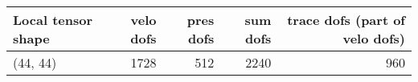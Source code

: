 \begin{tabular}{lrrrr}
\toprule
Local tensor shape &  velo dofs &  pres dofs &  sum dofs &  trace dofs (part of velo dofs) \\
\midrule
          (44, 44) &       1728 &        512 &      2240 &                             960 \\
\bottomrule
\end{tabular}
